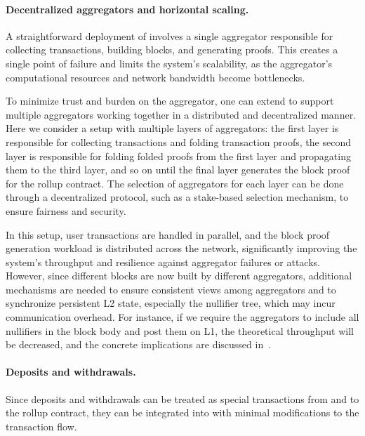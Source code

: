\paragraph{Decentralized aggregators and horizontal scaling.}
A straightforward deployment of \Protocol involves a single aggregator responsible for collecting transactions, building blocks, and generating proofs.
This creates a single point of failure and limits the system's scalability, as the aggregator's computational resources and network bandwidth become bottlenecks.

To minimize trust and burden on the aggregator, one can extend \Protocol to support multiple aggregators working together in a distributed and decentralized manner.
Here we consider a setup with multiple layers of aggregators: the first layer is responsible for collecting transactions and folding transaction proofs, the second layer is responsible for folding folded proofs from the first layer and propagating them to the third layer, and so on until the final layer generates the block proof for the rollup contract.
The selection of aggregators for each layer can be done through a decentralized protocol, such as a stake-based selection mechanism, to ensure fairness and security.

In this setup, user transactions are handled in parallel, and the block proof generation workload is distributed across the network, significantly improving the system's throughput and resilience against aggregator failures or attacks.
However, since different blocks are now built by different aggregators, additional mechanisms are needed to ensure consistent views among aggregators and to synchronize persistent \ac{L2} state, especially the nullifier tree, which may incur communication overhead.
For instance, if we require the aggregators to include all nullifiers in the block body and post them on \ac{L1}, the theoretical throughput will be decreased, and the concrete implications are discussed in~.

\paragraph{Deposits and withdrawals.}

Since deposits and withdrawals can be treated as special transactions from and to the rollup contract, they can be integrated into \Protocol with minimal modifications to the transaction flow. 

